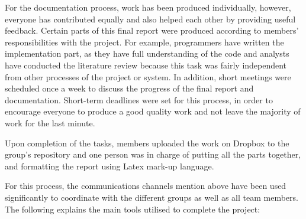 For the documentation process, work has been produced individually, however, everyone has contributed equally and also helped each other by providing useful feedback. Certain parts of this final report were produced according to members' responsibilities with the project. For example, programmers have written the implementation part, as they have full understanding of the code and analysts have conducted the literature review because this task was fairly independent from other processes of the project or system. In addition, short meetings were scheduled once a week to discuss the progress of the final report and documentation. Short-term deadlines were set for this process, in order to encourage everyone to produce a good quality work and not leave the majority of work for the last minute.\newline

Upon completion of the tasks, members uploaded the work on Dropbox to the group's repository and one person was in charge of putting all the parts together, and formatting the report using Latex mark-up language.\newline  

For this process, the communications channels mention above have been used significantly to coordinate with the different groups as well as all team members. The following  explains the main tools utilised to complete the project: 


